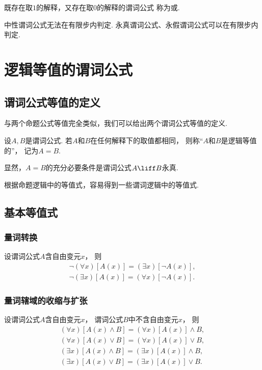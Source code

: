既存在取\(1\)的解释，又存在取\(0\)的解释的谓词公式
称为或.

\begin{theorem}
中性谓词公式无法在有限步内判定.
永真谓词公式、永假谓词公式可以在有限步内判定.
\end{theorem}

\section{逻辑等值的谓词公式}
\subsection{谓词公式等值的定义}
与两个命题公式等值完全类似，我们可以给出两个谓词公式等值的定义.
\begin{definition}
设\(A,B\)是谓词公式.
若\(A\)和\(B\)在任何解释下的取值都相同，
则称“\(A\)和\(B\)是逻辑等值的”，
记为\(A=B\).
\end{definition}

显然，\(A=B\)的充分必要条件是谓词公式\(A \liff B\)永真.

根据命题逻辑中的等值式，容易得到一些谓词逻辑中的等值式.

\subsection{基本等值式}
\subsubsection{量词转换}
设谓词公式\(A\)含自由变元\(x\)，
则\begin{gather}
	\neg(\forall x)[A(x)]
	= (\exists x)[\neg A(x)],
	\label{equation:数理逻辑.量词转换1} \\
	\neg(\exists x)[A(x)]
	= (\forall x)[\neg A(x)].
	\label{equation:数理逻辑.量词转换2}
\end{gather}

\subsubsection{量词辖域的收缩与扩张}
设谓词公式\(A\)含自由变元\(x\)，
谓词公式\(B\)中不含自由变元\(x\)，
则\begin{gather}
	(\forall x)[A(x) \land B]
	= (\forall x)[A(x)] \land B, \\
	(\forall x)[A(x) \lor B]
	= (\forall x)[A(x)] \lor B, \\
	(\exists x)[A(x) \land B]
	= (\exists x)[A(x)] \land B, \\
	(\exists x)[A(x) \lor B]
	= (\exists x)[A(x)] \lor B.
\end{gather}

